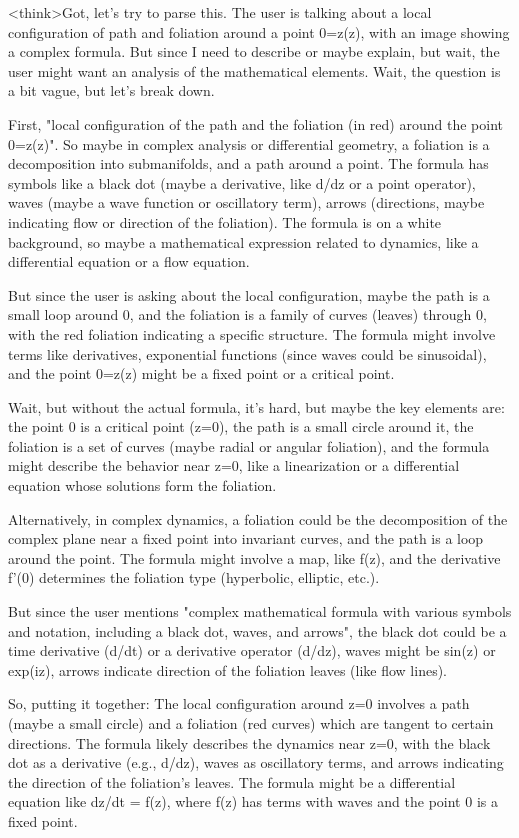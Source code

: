 <think>Got, let's try to parse this. The user is talking about a local configuration of path and foliation around a point 0=z(z), with an image showing a complex formula. But since I need to describe or maybe explain, but wait, the user might want an analysis of the mathematical elements. Wait, the question is a bit vague, but let's break down.

First, "local configuration of the path and the foliation (in red) around the point 0=z(z)". So maybe in complex analysis or differential geometry, a foliation is a decomposition into submanifolds, and a path around a point. The formula has symbols like a black dot (maybe a derivative, like d/dz or a point operator), waves (maybe a wave function or oscillatory term), arrows (directions, maybe indicating flow or direction of the foliation). The formula is on a white background, so maybe a mathematical expression related to dynamics, like a differential equation or a flow equation.

But since the user is asking about the local configuration, maybe the path is a small loop around 0, and the foliation is a family of curves (leaves) through 0, with the red foliation indicating a specific structure. The formula might involve terms like derivatives, exponential functions (since waves could be sinusoidal), and the point 0=z(z) might be a fixed point or a critical point.

Wait, but without the actual formula, it's hard, but maybe the key elements are: the point 0 is a critical point (z=0), the path is a small circle around it, the foliation is a set of curves (maybe radial or angular foliation), and the formula might describe the behavior near z=0, like a linearization or a differential equation whose solutions form the foliation.

Alternatively, in complex dynamics, a foliation could be the decomposition of the complex plane near a fixed point into invariant curves, and the path is a loop around the point. The formula might involve a map, like f(z), and the derivative f’(0) determines the foliation type (hyperbolic, elliptic, etc.).

But since the user mentions "complex mathematical formula with various symbols and notation, including a black dot, waves, and arrows", the black dot could be a time derivative (d/dt) or a derivative operator (d/dz), waves might be sin(z) or exp(iz), arrows indicate direction of the foliation leaves (like flow lines).

So, putting it together: The local configuration around z=0 involves a path (maybe a small circle) and a foliation (red curves) which are tangent to certain directions. The formula likely describes the dynamics near z=0, with the black dot as a derivative (e.g., d/dz), waves as oscillatory terms, and arrows indicating the direction of the foliation's leaves. The formula might be a differential equation like dz/dt = f(z), where f(z) has terms with waves and the point 0 is a fixed point.

